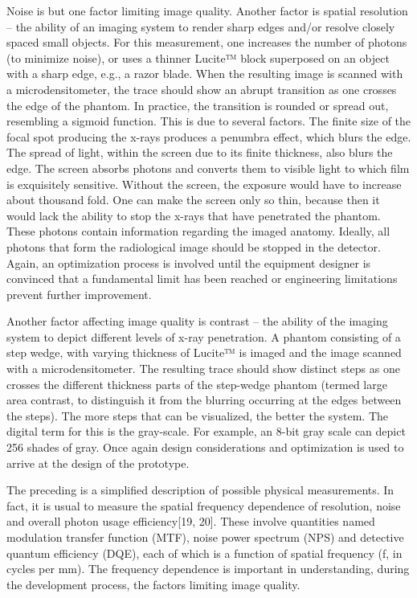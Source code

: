 \documentclass[
]{book}
\begin{document}
Noise is but one factor limiting image quality. Another factor is spatial resolution -- the ability of an imaging system to render sharp edges and/or resolve closely spaced small objects. For this measurement, one increases the number of photons (to minimize noise), or uses a thinner Lucite™ block superposed on an object with a sharp edge, e.g., a razor blade. When the resulting image is scanned with a microdensitometer, the trace should show an abrupt transition as one crosses the edge of the phantom. In practice, the transition is rounded or spread out, resembling a sigmoid function. This is due to several factors. The finite size of the focal spot producing the x-rays produces a penumbra effect, which blurs the edge. The spread of light, within the screen due to its finite thickness, also blurs the edge. The screen absorbs photons and converts them to visible light to which film is exquisitely sensitive. Without the screen, the exposure would have to increase about thousand fold. One can make the screen only so thin, because then it would lack the ability to stop the x-rays that have penetrated the phantom. These photons contain information regarding the imaged anatomy. Ideally, all photons that form the radiological image should be stopped in the detector. Again, an optimization process is involved until the equipment designer is convinced that a fundamental limit has been reached or engineering limitations prevent further improvement.

Another factor affecting image quality is contrast -- the ability of the imaging system to depict different levels of x-ray penetration. A phantom consisting of a step wedge, with varying thickness of Lucite™ is imaged and the image scanned with a microdensitometer. The resulting trace should show distinct steps as one crosses the different thickness parts of the step-wedge phantom (termed large area contrast, to distinguish it from the blurring occurring at the edges between the steps). The more steps that can be visualized, the better the system. The digital term for this is the gray-scale. For example, an 8-bit gray scale can depict 256 shades of gray. Once again design considerations and optimization is used to arrive at the design of the prototype.

The preceding is a simplified description of possible physical measurements. In fact, it is usual to measure the spatial frequency dependence of resolution, noise and overall photon usage efficiency{[}19, 20{]}. These involve quantities named modulation transfer function (MTF), noise power spectrum (NPS) and detective quantum efficiency (DQE), each of which is a function of spatial frequency (f, in cycles per mm). The frequency dependence is important in understanding, during the development process, the factors limiting image quality.
\end{document}
